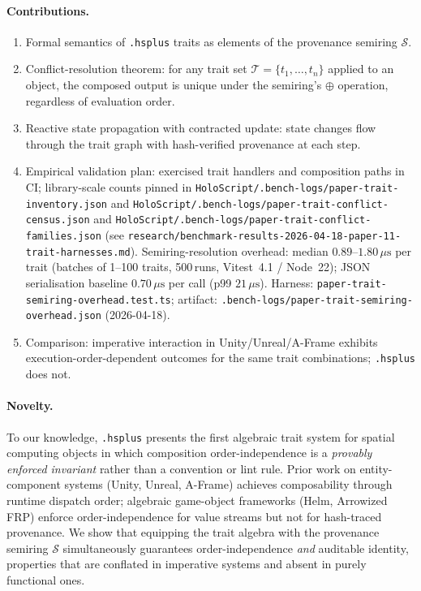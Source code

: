\documentclass[sigconf,nonacm]{acmart}
\newcommand{\hsplus}{\texttt{.hsplus}}
\newcommand{\tropplus}{\oplus}
\newcommand{\provsemiring}{\mathcal{S}}
\newcommand{\traitset}{\mathcal{T}}
\begin{document}
\paragraph{Contributions.}
\begin{enumerate}
  \item Formal semantics of \hsplus{} traits as elements of the
    provenance semiring $\provsemiring$.
  \item Conflict-resolution theorem: for any trait set
    $\traitset = \{t_1, \ldots, t_n\}$ applied to an object,
    the composed output is unique under the semiring's
    $\tropplus$ operation, regardless of evaluation order.
  \item Reactive state propagation with contracted update:
    state changes flow through the trait graph with hash-verified
    provenance at each step.
  \item Empirical validation plan: exercised trait handlers and
    composition paths in CI; library-scale counts pinned in
    \texttt{HoloScript/.bench-logs/paper-trait-inventory.json} and
    \texttt{HoloScript/.bench-logs/paper-trait-conflict-census.json} and
    \texttt{HoloScript/.bench-logs/paper-trait-conflict-families.json}
    (see \texttt{research/benchmark-results-2026-04-18-paper-11-trait-harnesses.md}).
    Semiring-resolution overhead: median $0.89$--$1.80\,\mu\text{s}$ per trait (batches of 1--100 traits, 500\,runs, Vitest~4.1 / Node~22); JSON serialisation baseline $0.70\,\mu\text{s}$ per call (p99 $21\,\mu\text{s}$). Harness: \texttt{paper-trait-semiring-overhead.test.ts}; artifact: \texttt{.bench-logs/paper-trait-semiring-overhead.json} (2026-04-18).
  \item Comparison: imperative interaction in Unity/Unreal/A-Frame
    exhibits execution-order-dependent outcomes for the same trait
    combinations; \hsplus{} does not.
\end{enumerate}

\paragraph{Novelty.}
To our knowledge, \hsplus{} presents the first algebraic trait
system for spatial computing objects in which composition
order-independence is a \emph{provably enforced invariant}
rather than a convention or lint rule. Prior work on
entity-component systems (Unity, Unreal, A-Frame) achieves
composability through runtime dispatch order; algebraic
game-object frameworks (Helm, Arrowized FRP) enforce order-independence
for value streams but not for hash-traced provenance. We show
that equipping the trait algebra with the provenance semiring
$\provsemiring$ simultaneously guarantees order-independence
\emph{and} auditable identity, properties that are conflated in
imperative systems and absent in purely functional ones.
\end{document}
